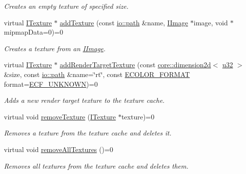 \begin{DoxyCompactItemize}
\begin{DoxyCompactList}\small\item\em Creates an empty texture of specified size. \end{DoxyCompactList}\item 
virtual \hyperlink{classirr_1_1video_1_1ITexture}{I\+Texture} $\ast$ \hyperlink{classirr_1_1video_1_1IVideoDriver_abfebeb09a692c0d6b4741d952d97668e}{add\+Texture} (const \hyperlink{namespaceirr_1_1io_a6468281622ce3a1c46b72e19f32dded5}{io\+::path} \&name, \hyperlink{classirr_1_1video_1_1IImage}{I\+Image} $\ast$image, void $\ast$mipmap\+Data=0)=0
\begin{DoxyCompactList}\small\item\em Creates a texture from an \hyperlink{classirr_1_1video_1_1IImage}{I\+Image}. \end{DoxyCompactList}\item 
virtual \hyperlink{classirr_1_1video_1_1ITexture}{I\+Texture} $\ast$ \hyperlink{classirr_1_1video_1_1IVideoDriver_aa704cece826ee37d02e4bb054b0b8797}{add\+Render\+Target\+Texture} (const \hyperlink{classirr_1_1core_1_1dimension2d}{core\+::dimension2d}$<$ \hyperlink{namespaceirr_a0416a53257075833e7002efd0a18e804}{u32} $>$ \&size, const \hyperlink{namespaceirr_1_1io_a6468281622ce3a1c46b72e19f32dded5}{io\+::path} \&name=\char`\"{}rt\char`\"{}, const \hyperlink{namespaceirr_1_1video_a1d5e487888c32b1674a8f75116d829ed}{E\+C\+O\+L\+O\+R\+\_\+\+F\+O\+R\+M\+AT} format=\hyperlink{namespaceirr_1_1video_a1d5e487888c32b1674a8f75116d829eda8d25e5e1e9c83f95c4f7d48e11688a51}{E\+C\+F\+\_\+\+U\+N\+K\+N\+O\+WN})=0
\begin{DoxyCompactList}\small\item\em Adds a new render target texture to the texture cache. \end{DoxyCompactList}\item 
virtual void \hyperlink{classirr_1_1video_1_1IVideoDriver_ac88319ec41daa23fef2ae935285afcc9}{remove\+Texture} (\hyperlink{classirr_1_1video_1_1ITexture}{I\+Texture} $\ast$texture)=0
\begin{DoxyCompactList}\small\item\em Removes a texture from the texture cache and deletes it. \end{DoxyCompactList}\item 
virtual void \hyperlink{classirr_1_1video_1_1IVideoDriver_a179990e76fa91175d46c891b3508e717}{remove\+All\+Textures} ()=0
\begin{DoxyCompactList}\small\item\em Removes all textures from the texture cache and deletes them. \end{DoxyCompactList}\item 

\end{DoxyCompactItemize}
